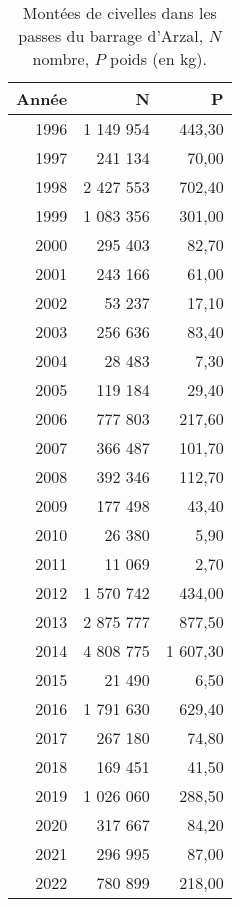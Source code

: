 \begin{table}[htbp]
\centering
\begin{tabular}{rrr}
  \hline
Année & N & P \\ 
  \hline
1996 & 1 149 954 & 443,30 \\ 
  1997 & 241 134 & 70,00 \\ 
  1998 & 2 427 553 & 702,40 \\ 
  1999 & 1 083 356 & 301,00 \\ 
  2000 & 295 403 & 82,70 \\ 
  2001 & 243 166 & 61,00 \\ 
  2002 & 53 237 & 17,10 \\ 
  2003 & 256 636 & 83,40 \\ 
  2004 & 28 483 & 7,30 \\ 
  2005 & 119 184 & 29,40 \\ 
  2006 & 777 803 & 217,60 \\ 
  2007 & 366 487 & 101,70 \\ 
  2008 & 392 346 & 112,70 \\ 
  2009 & 177 498 & 43,40 \\ 
  2010 & 26 380 & 5,90 \\ 
  2011 & 11 069 & 2,70 \\ 
  2012 & 1 570 742 & 434,00 \\ 
  2013 & 2 875 777 & 877,50 \\ 
  2014 & 4 808 775 & 1 607,30 \\ 
  2015 & 21 490 & 6,50 \\ 
  2016 & 1 791 630 & 629,40 \\ 
  2017 & 267 180 & 74,80 \\ 
  2018 & 169 451 & 41,50 \\ 
  2019 & 1 026 060 & 288,50 \\ 
  2020 & 317 667 & 84,20 \\ 
  2021 & 296 995 & 87,00 \\ 
  2022 & 780 899 & 218,00 \\ 
   \hline
\end{tabular}
\caption{Montées de civelles dans les passes du barrage d'Arzal, $N$ nombre,
				$P$ poids (en kg).} 
\label{table_civelle}
\end{table}
